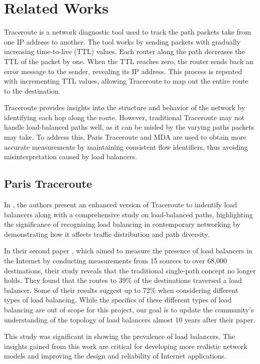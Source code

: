 \documentclass[12pt]{cwru_thesis}
\begin{document}
\chapter{Related Works}

Traceroute is a network diagnostic tool used to track the path packets take from one IP address to another. The tool works by sending packets with gradually increasing time-to-live (TTL) values. Each router along the path decreases the TTL of the packet by one. When the TTL reaches zero, the router sends back an error message to the sender, revealing its IP address. This process is repeated with incrementing TTL values, allowing Traceroute to map out the entire route to the destination.

Traceroute provides insights into the structure and behavior of the network by identifying each hop along the route. However, traditional Traceroute may not handle load-balanced paths well, as it can be misled by the varying paths packets may take. To address this, Paris Traceroute and MDA are used to obtain more accurate measurements by maintaining consistent flow identifiers, thus avoiding misinterpretation caused by load balancers.

\section{Paris Traceroute}
In  \cite{4261334}, the authors present an enhanced version of Traceroute to indentify load balancers along with a comprehensive study on load-balanced paths, highlighting the significance of recognizing load balancing in contemporary networking by demonstrating how it affects traffic distribution and path diversity. 

In their second paper  \cite{augustin2010measuring}, which aimed to measure the presence of load balancers in the Internet by conducting measurements from 15 sources to over 68,000 destinations, their study reveals that the traditional single-path concept no longer holds. They found that the routes to 39\% of the destinations traversed a load balancer. Some of their results suggest up to 72\% when considering different types of load balancing. While the specifics of these different types of load balancing are out of scope for this project, our goal is to update the community's understanding of the topology of load balancers almost 10 years after their paper.


This study was significant in showing the prevalence of load balancers. The insights gained from this work are critical for developing more realistic network models and improving the design and reliability of Internet applications.
\end{document}
